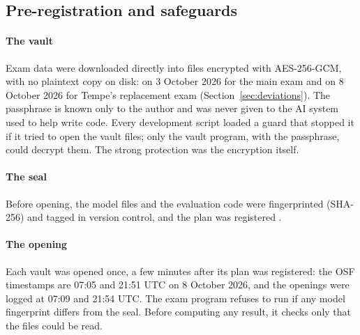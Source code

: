 \documentclass[preprint,12pt,authoryear]{elsarticle}
\begin{document}
\subsection{Pre-registration and safeguards}
\paragraph{The vault} Exam data were downloaded directly into files encrypted with AES-256-GCM, with no plaintext copy on disk: on 3 October 2026 for the main exam and on 8 October 2026 for Tempe's replacement exam (Section~\ref{sec:deviations}). The passphrase is known only to the author and was never given to the AI system used to help write code. Every development script loaded a guard that stopped it if it tried to open the vault files; only the vault program, with the passphrase, could decrypt them. The strong protection was the encryption itself.

\paragraph{The seal} Before opening, the model files and the evaluation code were fingerprinted (SHA-256) and tagged in version control, and the plan was registered \citep{osf_main}.

\paragraph{The opening} Each vault was opened once, a few minutes after its plan was registered: the OSF timestamps are 07:05 and 21:51 UTC on 8 October 2026, and the openings were logged at 07:09 and 21:54 UTC. The exam program refuses to run if any model fingerprint differs from the seal. Before computing any result, it checks only that the files could be read.
\end{document}

